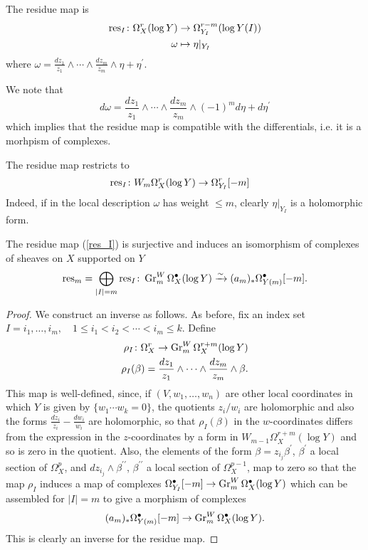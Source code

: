 \documentclass[../main.tex]{subfiles}
\begin{document}
\begin{defn}
The residue map is
    \begin{align*}
    \operatorname{res}_I \colon \Omega^r_X( \log Y) &\to \Omega^{r-m}_{Y_I}( \log Y(I))  \\
          \omega &\mapsto \eta|_{Y_I} 
    \end{align*}
where $\omega = \frac{dz_1}{z_1} \wedge \cdots \wedge\frac{dz_m}{z_m}\wedge \eta + \eta^\prime$.
  \end{defn}

    
We note that
\[
d\omega = \frac{dz_1}{z_1} \wedge \cdots \wedge\frac{dz_m}{z_m}
\wedge (-1)^m d\eta + d\eta^\prime
\]
which implies that the residue map is compatible with the differentials, i.e. it is a morhpism of complexes. 

\begin{rem}
The residue map restricts to
\begin{align}
    \operatorname{res}_I \colon W_m\Omega^r_X( \log Y) &\to \Omega^r_{Y_I}[-m]
\label{res_I}
\end{align}
Indeed, if in the local description $\omega$ has weight $\leq m$, clearly $\eta|_{Y_I}$ is a holomorphic form.
\end{rem}

  \begin{lemma}\label{lemmaresiso}
      The residue map (\ref{res_I}) is surjective and induces an isomorphism of complexes of sheaves on $X$ supported on $Y$
      \begin{align}
          \operatorname{res}_m = \bigoplus_{|I|=m}\operatorname{res}_I \colon \operatorname{Gr}^W_m \Omega^\bullet_X(\log Y) \xrightarrow{\sim} (a_m)_* \Omega^\bullet_{Y(m)}[-m]. \label{resiso}
      \end{align}
  \end{lemma}
\begin{proof}
    We construct an inverse as follows. As before, fix an index set $I = {i_1,\dots ,i_m}, \quad 1 \leq i_1 < i_2 < \cdots < i_m \leq k$. Define
    \begin{align*}
        \rho_I \colon \Omega^r_X \to \operatorname{Gr}^W_m \Omega^{r+m}_X (\log Y) \\
        \rho_I (\beta) =\frac{dz_1}{z_1} \wedge \cdots \wedge\frac{dz_m}{z_m} \wedge \beta.
    \end{align*}
This map is well-defined, since, if $(V,w_1,\dots ,w_n)$ are other local coordinates in which $Y$ is given by $\{ w_1 \cdots  w_k = 0 \}$, the quotients $z_i/w_i$ are holomorphic and also the
forms $\frac{dz_i}{z_i}-\frac{dw_i}{w_i}$ are holomorphic, so that $\rho_I (\beta)$ in the $w$-coordinates differs from the expression in the $z$-coordinates by a form in $W_{m-1}\Omega^{r+m}_X (\log Y)$ and so is zero in the quotient. Also, the elements of the form $\beta = z_{i_j} \beta^\prime$, $\beta^\prime$ a local section of $\Omega^p_X$, and $dz_{i_j} \wedge \beta^{\prime\prime}$, $\beta^{\prime\prime}$ a local section of $\Omega^{p-1}_X$, map to zero so that the map $\rho_I$ induces a map of complexes $\Omega^\bullet_{Y_I}[-m] \to \operatorname{Gr}^W_m \Omega^\bullet_X(\log Y)$ which can be assembled for $|I| = m$ to give a morphism of complexes 
\[
(a_m)_*\Omega^\bullet_{Y(m)}[-m] \to \operatorname{Gr}^W_m \Omega^\bullet_X(\log Y).
\]
This is clearly an inverse for the residue map.
\end{proof}
\end{document}
